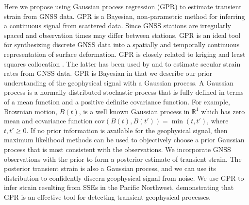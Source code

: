 \documentclass[extra,mreferee]{gji}
\begin{document}
Here we propose using Gaussian process regression (GPR) \citep{Rasmussen2006} to estimate transient strain from GNSS data. GPR is a Bayesian, non-parametric method for inferring a continuous signal from scattered data. Since GNSS stations are irregularly spaced and observation times may differ between stations, GPR is an ideal tool for synthesizing discrete GNSS data into a spatially and temporally continuous representation of surface deformation. GPR is closely related to kriging \citep{Cressie1992} and least squares collocation \citep{Moritz1978}. The latter has been used by \citet{Kato1998} and \citet{El-Fiky1999} to estimate secular strain rates from GNSS data. GPR is Bayesian in that we describe our prior understanding of the geophysical signal with a Gaussian process. A Gaussian process is a normally distributed stochastic process that is fully defined in terms of a mean function and a positive definite covariance function. For example, Brownian motion, $B(t)$, is a well known Gaussian process in $\mathbb{R}^1$ which has zero mean and covariance function $\mathrm{cov}(B(t),B(t')) = \min(t,t')$, where $t,t' \ge 0$. If no prior information is available for the geophysical signal, then maximum likelihood methods can be used to objectively choose a prior Gaussian process that is most consistent with the observations.  We incorporate GNSS observations with the prior to form a posterior estimate of transient strain.  The posterior transient strain is also a Gaussian process, and we can use its distribution to confidently discern geophysical signal from noise. We use GPR to infer strain resulting from SSEs in the Pacific Northwest, demonstrating that GPR is an effective tool for detecting transient geophysical processes. 
\end{document}
